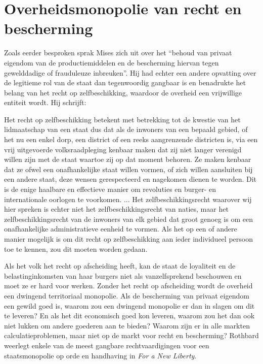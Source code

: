 \hypertarget{overheidsmonopolie-van-recht-en-bescherming}{%
\section{Overheidsmonopolie van recht en bescherming}\label{overheidsmonopolie-van-recht-en-bescherming}}

Zoals eerder besproken sprak Mises zich uit over het ``behoud van privaat eigendom van de productiemiddelen en de bescherming hiervan tegen gewelddadige of frauduleuze inbreuken''. Hij had echter een andere opvatting over de legitieme rol van de staat dan tegenwoordig gangbaar is en benadrukte het belang van het recht op zelfbeschikking, waardoor de overheid een vrijwillige entiteit wordt. Hij schrijft:

\begin{blockquotebox}
Het recht op zelfbeschikking betekent met betrekking tot de kwestie van het lidmaatschap van een staat dus dat als de inwoners van een bepaald gebied, of het nu een enkel dorp, een district of een reeks aangrenzende districten is, via een vrij uitgevoerde volksraadpleging kenbaar maken dat zij niet langer verenigd willen zijn met de staat waartoe zij op dat moment behoren. Ze maken kenbaar dat ze ofwel een onafhankelijke staat willen vormen, of zich willen aansluiten bij een andere staat, deze wensen gerespecteerd en nagekomen dienen te worden. Dit is de enige haalbare en effectieve manier om revoluties en burger- en internationale oorlogen te voorkomen. ... Het zelfbeschikkingsrecht waarover wij hier spreken is echter niet het zelfbeschikkingsrecht van naties, maar het zelfbeschikkingsrecht van de inwoners van elk gebied dat groot genoeg is om een onafhankelijke administratieve eenheid te vormen. Als het op een of andere manier mogelijk is om dit recht op zelfbeschikking aan ieder individueel persoon toe te kennen, zou dit moeten worden gedaan.\footnotemark
\end{blockquotebox}

Als het volk het recht op afscheiding heeft, kan de staat de loyaliteit en de belastinginkomsten van haar burgers niet als vanzelfsprekend beschouwen en moet ze er hard voor werken. Zonder het recht op afscheiding wordt de overheid een dwingend territoriaal monopolie. Als de bescherming van privaat eigendom een gewild goed is, waarom zou een dwingend monopolie er dan in slagen om dit te leveren? En als het dit economisch goed kon leveren, waarom zou het dan ook niet lukken om andere goederen aan te bieden? Waarom zijn er in alle markten calculatieproblemen, maar niet op de markt voor recht en bescherming? Rothbard weerlegt enkele van de meest gangbare rechtvaardigingen voor een staatsmonopolie op orde en handhaving in \emph{For a New Liberty}.\autocite{205}


